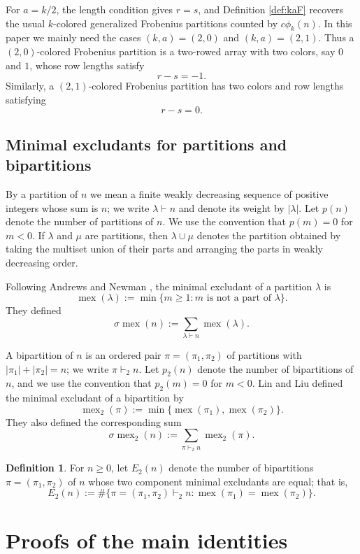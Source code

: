 \documentclass[12pt]{amsart}
\theoremstyle{definition}
\newtheorem{definition}[theorem]{Definition}
\theoremstyle{remark}
\numberwithin{equation}{section}
\newcommand{\mex}{\operatorname{mex}}
\newcommand{\smex}{\sigma\operatorname{mex}}
\begin{document}
For $a=k/2$, the length condition gives $r=s$, and Definition \ref{def:kaF} recovers the usual $k$-colored generalized Frobenius partitions counted by $c\phi_k(n)$.  In this paper we mainly need the cases $(k,a)=(2,0)$ and $(k,a)=(2,1)$.  Thus a $(2,0)$-colored Frobenius partition is a two-rowed array with two colors, say $0$ and $1$, whose row lengths satisfy
\[
r-s=-1.
\]
Similarly, a $(2,1)$-colored Frobenius partition has two colors and row lengths satisfying
\[
r-s=0.
\]



\subsection{Minimal excludants for partitions and bipartitions}

By a partition of $n$ we mean a finite weakly decreasing sequence of positive integers whose sum is $n$; we write $\lambda\vdash n$ and denote its weight by $|\lambda|$.  Let $p(n)$ denote the number of partitions of $n$.  We use the convention that $p(m)=0$ for $m<0$.  If $\lambda$ and $\mu$ are partitions, then $\lambda\cup\mu$ denotes the partition obtained by taking the multiset union of their parts and arranging the parts in weakly decreasing order.

Following Andrews and Newman \cite{AndrewsNewman}, the minimal excludant of a partition $\lambda$ is
\[
\mex(\lambda):=\min\{m\geq 1:m\text{ is not a part of }\lambda\}.
\]
They defined
\[
\smex(n):=\sum_{\lambda\vdash n}\mex(\lambda).
\]

A bipartition of $n$ is an ordered pair $\pi=(\pi_1,\pi_2)$ of partitions with $|\pi_1|+|\pi_2|=n$; we write $\pi\vdash_2 n$.  Let $p_2(n)$ denote the number of bipartitions of $n$, and we use the convention that $p_2(m)=0$ for $m<0$.  Lin and Liu \cite{LinLiu} defined the minimal excludant of a bipartition by
\[
\mex_2(\pi):=\min\{\mex(\pi_1),\mex(\pi_2)\}.
\]
They also defined the corresponding sum
\[
\sigma\mex_2(n):=\sum_{\pi\vdash_2 n}\mex_2(\pi).
\]

\begin{definition}\label{def.equal.mex2}
For $n\geq 0$, let $E_2(n)$ denote the number of bipartitions $\pi=(\pi_1,\pi_2)$ of $n$ whose two component minimal excludants are equal; that is,
\[
E_2(n):=
\#\{\pi=(\pi_1,\pi_2)\vdash_2 n:\mex(\pi_1)=\mex(\pi_2)\}.
\]
\end{definition}

\section{Proofs of the main identities}
\end{document}
